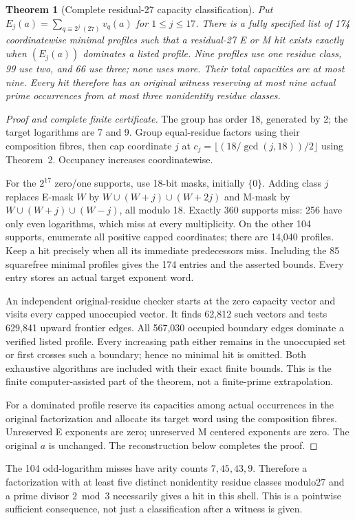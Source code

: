 \documentclass[10pt,a4paper]{article}
\newtheorem{theorem}{Theorem}
\begin{document}
\begin{theorem}[Complete residual-27 capacity classification]
Put $E_j(a)=\sum_{q\equiv2^j\ (27)}v_q(a)$ for $1\le j\le17$.
There is a fully specified list of 174 coordinatewise minimal profiles such
that a residual-27 E or M hit exists exactly when $(E_j(a))$ dominates a
listed profile. Nine profiles use one residue class, 99 use two, and 66 use
three; none uses more. Their total capacities are at most nine.
Every hit therefore has an original witness reserving at most nine actual
prime occurrences from at most three nonidentity residue classes.
\end{theorem}
\begin{proof}[Proof and complete finite certificate]
The group has order 18, generated by 2; the target logarithms are 7 and 9.
Group equal-residue factors using their composition fibres, then cap coordinate
$j$ at $c_j=\lfloor(18/\gcd(j,18))/2\rfloor$ using Theorem~2.
Occupancy increases coordinatewise.

For the $2^{17}$ zero/one supports, use 18-bit masks, initially $\{0\}$.
Adding class $j$ replaces E-mask $W$ by $W\cup(W+j)\cup(W+2j)$ and M-mask by
$W\cup(W+j)\cup(W-j)$, all modulo 18. Exactly 360 supports miss: 256 have only
even logarithms, which miss at every multiplicity. On the other 104 supports,
enumerate all positive capped coordinates; there are 14,040 profiles. Keep a
hit precisely when all its immediate predecessors miss. Including the 85
squarefree minimal profiles gives the 174 entries and the asserted bounds.
Every entry stores an actual target exponent word.

An independent original-residue checker starts at the zero capacity vector
and visits every capped unoccupied vector. It finds 62,812 such vectors and
tests 629,841 upward frontier edges. All 567,030 occupied boundary edges dominate
a verified listed profile. Every increasing path either remains in the
unoccupied set or first crosses such a boundary; hence no minimal hit is
omitted. Both exhaustive algorithms are included with their exact finite
bounds. This is the finite computer-assisted part of the theorem, not a
finite-prime extrapolation.

For a dominated profile reserve its capacities among actual occurrences in
the original factorization and allocate its target word using the composition
fibres. Unreserved E exponents are zero; unreserved M centered exponents are
zero. The original $a$ is unchanged. The reconstruction below completes the proof.
\end{proof}
The 104 odd-logarithm misses have arity counts $7,45,43,9$. Therefore a factorization with at least five distinct nonidentity residue classes modulo27 and a prime divisor $2\bmod3$ necessarily gives a hit in this shell. This is a pointwise sufficient consequence, not just a classification after a witness is given.
\end{document}
